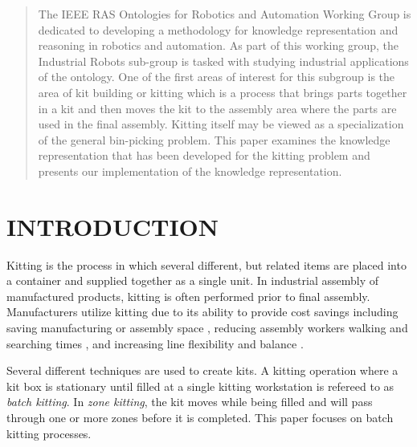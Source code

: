 






\maketitle
\thispagestyle{empty}
\pagestyle{empty}


\begin{abstract}

The IEEE RAS Ontologies for Robotics and Automation Working Group is dedicated to developing a methodology for knowledge representation and reasoning in robotics and automation. As part of this working group, the Industrial Robots sub-group is tasked with studying industrial applications of the ontology. One of the first areas of interest for this subgroup is the area of kit building or kitting which is a process that brings parts together in a kit and then moves the kit to the assembly area where the parts are used in the final assembly. Kitting itself may be viewed as a specialization of the general bin-picking problem. This paper examines the knowledge representation that has been developed for the kitting problem and presents our implementation of the knowledge representation.

\end{abstract}


\section{INTRODUCTION}
Kitting is the process in which several different, but related items are placed into a container and supplied together as a single unit.
In industrial assembly of manufactured products, kitting is often performed prior to final assembly. Manufacturers utilize kitting
due to its ability to provide cost savings \cite{Carlsson_2008} including saving manufacturing or assembly space \cite{Medbo2003}, reducing assembly workers walking and searching times \cite{Schwind1992}, and increasing line flexibility \cite{Bozer1992} and balance \cite{Jiao2000}.

Several different techniques are used to create kits. A kitting operation where a kit box is stationary until filled at a single
kitting workstation is refereed to as {\it batch kitting}. In {\it zone kitting}, the kit moves while being filled and will pass through one or
more zones before it is completed. This paper focuses on batch kitting processes.


